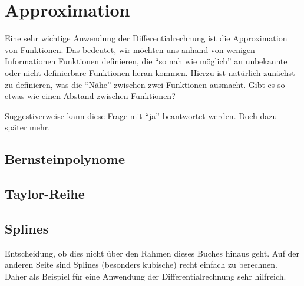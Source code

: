 
\chapter{Approximation}

Eine sehr wichtige Anwendung der Differentialrechnung ist die Approximation von Funktionen. Das bedeutet, wir möchten uns anhand von wenigen Informationen Funktionen definieren, die "`so nah wie möglich"' an unbekannte oder nicht definierbare Funktionen heran kommen. Hierzu ist natürlich zunächst zu definieren, was die "`Nähe"' zwischen zwei Funktionen ausmacht. Gibt es so etwas wie einen Abstand zwischen Funktionen? 

Suggestiverweise kann diese Frage mit "`ja"' beantwortet werden. Doch dazu später mehr. 

\section{Bernsteinpolynome}

\begin{TODO}
\end{TODO}

\section{Taylor-Reihe}

\begin{TODO}
\end{TODO}

\section{Splines}

\begin{TODO}
Entscheidung, ob dies nicht über den Rahmen dieses Buches hinaus geht. Auf der anderen Seite sind Splines (besonders kubische) recht einfach zu berechnen. Daher als Beispiel für eine Anwendung der Differentialrechnung sehr hilfreich.
\end{TODO}